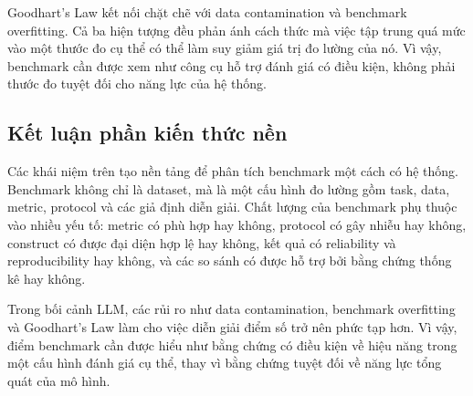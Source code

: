Goodhart's Law kết nối chặt chẽ với data contamination và benchmark overfitting. Cả ba hiện tượng đều phản ánh cách thức mà việc tập trung quá mức vào một thước đo cụ thể có thể làm suy giảm giá trị đo lường của nó. Vì vậy, benchmark cần được xem như công cụ hỗ trợ đánh giá có điều kiện, không phải thước đo tuyệt đối cho năng lực của hệ thống.

\subsection{Kết luận phần kiến thức nền}
\label{sec:foundations_conclusion}

Các khái niệm trên tạo nền tảng để phân tích benchmark một cách có hệ thống. Benchmark không chỉ là dataset, mà là một cấu hình đo lường gồm task, data, metric, protocol và các giả định diễn giải. Chất lượng của benchmark phụ thuộc vào nhiều yếu tố: metric có phù hợp hay không, protocol có gây nhiễu hay không, construct có được đại diện hợp lệ hay không, kết quả có reliability và reproducibility hay không, và các so sánh có được hỗ trợ bởi bằng chứng thống kê hay không.

Trong bối cảnh LLM, các rủi ro như data contamination, benchmark overfitting và Goodhart's Law làm cho việc diễn giải điểm số trở nên phức tạp hơn. Vì vậy, điểm benchmark cần được hiểu như bằng chứng có điều kiện về hiệu năng trong một cấu hình đánh giá cụ thể, thay vì bằng chứng tuyệt đối về năng lực tổng quát của mô hình.